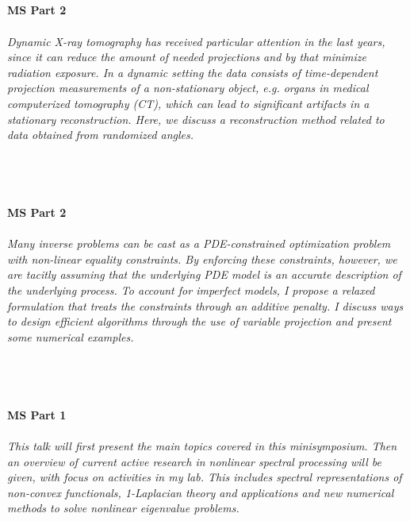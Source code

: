 \begin{multicols}{2}
\\ 
    \\
    \\\\
    \noindent\textbf{MS Part 2}\\
\\  
    \textit{Dynamic X-ray tomography has received particular attention in the last years, since it can reduce the amount of needed projections and by that minimize radiation exposure. In a dynamic setting the data consists of time-dependent projection measurements of a non-stationary object, e.g. organs in medical computerized tomography (CT), which can lead to significant artifacts in a stationary reconstruction. Here, we discuss a reconstruction method related to data obtained from randomized angles.}\\
\\ 
    \\
    \\\\
    \noindent\textbf{MS Part 2}\\
\\  
    \textit{Many inverse problems can be cast as a PDE-constrained optimization problem with non-linear equality constraints. By enforcing these constraints, however, we are tacitly assuming that the underlying PDE model is an accurate description of the underlying process. To account for imperfect models, I propose a relaxed formulation that treats the constraints through an additive penalty. I discuss ways to design efficient algorithms through the use of variable projection and present some numerical examples.}\\
\\ 
    \\
    \\\\
    \noindent\textbf{MS Part 1}\\
\\  
    \textit{This talk will first present the main topics covered in this minisymposium. Then an overview of current active research in nonlinear spectral processing will be given, with focus on activities in my lab. This includes spectral representations of non-convex functionals, 1-Laplacian theory and applications and new numerical methods to solve nonlinear eigenvalue problems.  }\\
\\ 

\end{multicols}
